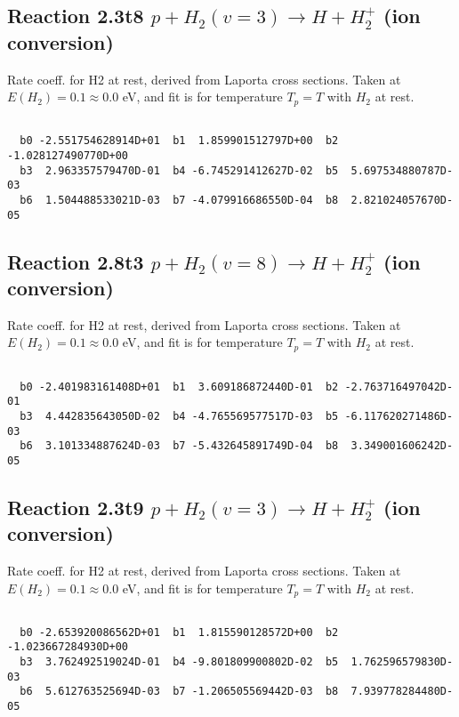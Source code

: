 \documentclass[12pt,dvipdfmx]{article}
\begin{document}
\newpage
\subsection{
Reaction 2.3t8
$ p + H_2(v=3) \rightarrow H + H_2^+$ (ion conversion)
}
Rate coeff. for H2 at rest, derived from Laporta cross sections.
Taken at $E(H_2) = 0.1 \approx 0.0$ eV,  and fit is for temperature $T_p=T$ with $H_2$ at rest.

\begin{small}\begin{verbatim}

  b0 -2.551754628914D+01  b1  1.859901512797D+00  b2 -1.028127490770D+00
  b3  2.963357579470D-01  b4 -6.745291412627D-02  b5  5.697534880787D-03
  b6  1.504488533021D-03  b7 -4.079916686550D-04  b8  2.821024057670D-05

\end{verbatim}\end{small}

\newpage
\subsection{
Reaction 2.8t3
$ p + H_2(v=8) \rightarrow H + H_2^+$ (ion conversion)
}
Rate coeff. for H2 at rest, derived from Laporta cross sections.
Taken at $E(H_2) = 0.1 \approx 0.0$ eV,  and fit is for temperature $T_p=T$ with $H_2$ at rest.

\begin{small}\begin{verbatim}

  b0 -2.401983161408D+01  b1  3.609186872440D-01  b2 -2.763716497042D-01
  b3  4.442835643050D-02  b4 -4.765569577517D-03  b5 -6.117620271486D-03
  b6  3.101334887624D-03  b7 -5.432645891749D-04  b8  3.349001606242D-05

\end{verbatim}\end{small}

\newpage
\subsection{
Reaction 2.3t9
$ p + H_2(v=3) \rightarrow H + H_2^+$ (ion conversion)
}
Rate coeff. for H2 at rest, derived from Laporta cross sections.
Taken at $E(H_2) = 0.1 \approx 0.0$ eV,  and fit is for temperature $T_p=T$ with $H_2$ at rest.

\begin{small}\begin{verbatim}

  b0 -2.653920086562D+01  b1  1.815590128572D+00  b2 -1.023667284930D+00
  b3  3.762492519024D-01  b4 -9.801809900802D-02  b5  1.762596579830D-03
  b6  5.612763525694D-03  b7 -1.206505569442D-03  b8  7.939778284480D-05

\end{verbatim}\end{small}
\end{document}

